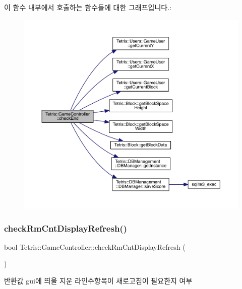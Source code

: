이 함수 내부에서 호출하는 함수들에 대한 그래프입니다.\+:
\nopagebreak
\begin{figure}[H]
\begin{center}
\leavevmode
\includegraphics[width=350pt]{class_tetris_1_1_game_controller_ac8058c827eaa393194dcfb83c6964f8a_cgraph}
\end{center}
\end{figure}
\mbox{\label{class_tetris_1_1_game_controller_a1fcdadbf63bb0d908e1033496d6f9d16}} 
\subsubsection{\texorpdfstring{check\+Rm\+Cnt\+Display\+Refresh()}{checkRmCntDisplayRefresh()}}
{\footnotesize\ttfamily bool Tetris\+::\+Game\+Controller\+::check\+Rm\+Cnt\+Display\+Refresh (\begin{DoxyParamCaption}{ }\end{DoxyParamCaption})\hspace{0.3cm}{\ttfamily [inline]}}

\begin{DoxyReturn}{반환값}
gui에 띄울 \textquotesingle{}지운 라인수\textquotesingle{}항목이 새로고침이 필요한지 여부 
\end{DoxyReturn}


